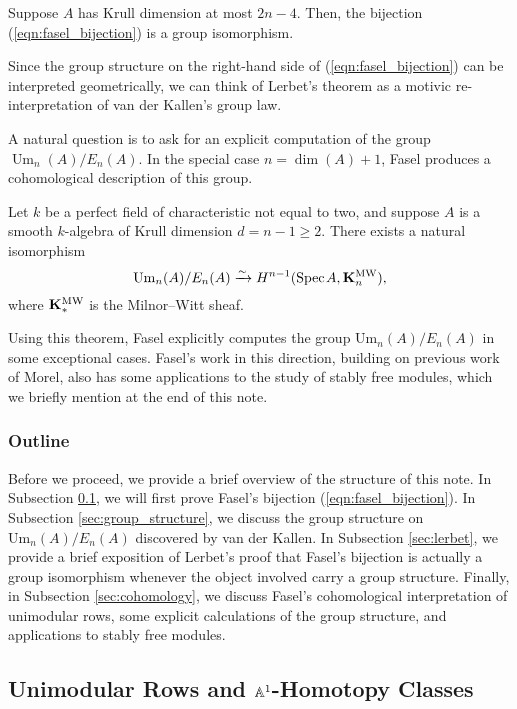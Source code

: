 \begin{theorem}[Lerbet, 2024]
    Suppose $A$ has Krull dimension at most $2n-4$. Then, the bijection (\ref{eqn:fasel_bijection}) is a group isomorphism.
\end{theorem}

Since the group structure on the right-hand side of (\ref{eqn:fasel_bijection}) can be interpreted geometrically, we can think of Lerbet's theorem as a motivic re-interpretation of van der Kallen's group law. 

A natural question is to ask for an explicit computation of the group $\operatorname{Um}_n(A)/E_n(A)$. In the special case $n = \dim(A) + 1$, Fasel \cite{Fasel_2010} produces a cohomological description of this group.

\begin{theorem}[Fasel, 2010]\label{thm:fasel_cohomology}
    Let $k$ be a perfect field of characteristic not equal to two, and suppose $A$ is a smooth $k$-algebra of Krull dimension $d = n-1 \geq 2$. There exists a natural isomorphism 
    \[
    \mathrm{Um}_n(A)/E_n(A) \xrightarrow{\sim} H^{n-1}(\text{Spec}\hspace{0.1em} A,\mathbf{K}^\mathrm{MW}_n),
    \]
    where $\mathbf{K}^\mathrm{MW}_\ast$ is the Milnor--Witt sheaf.
\end{theorem}

Using this theorem, Fasel explicitly computes the group $\mathrm{Um}_n(A)/E_n(A)$ in some exceptional cases. Fasel's work in this direction, building on previous work of Morel, also has some applications to the study of stably free modules, which we briefly mention at the end of this note.

\subsubsection{Outline} Before we proceed, we provide a brief overview of the structure of this note. In Subsection \ref{sec:fasel}, we will first prove Fasel's bijection (\ref{eqn:fasel_bijection}). In Subsection \ref{sec:group_structure}, we discuss the group structure on $\mathrm{Um}_n(A)/E_n(A)$ discovered by van der Kallen. In Subsection \ref{sec:lerbet}, we provide a brief exposition of Lerbet's proof that Fasel's bijection is actually a group isomorphism whenever the object involved carry a group structure. Finally, in Subsection \ref{sec:cohomology}, we discuss Fasel's cohomological interpretation of unimodular rows, some explicit calculations of the group structure, and applications to stably free modules.  

\subsection{Unimodular Rows and \texorpdfstring{$\mathbb{A}^1$}{A1}-Homotopy Classes}\label{sec:fasel}

